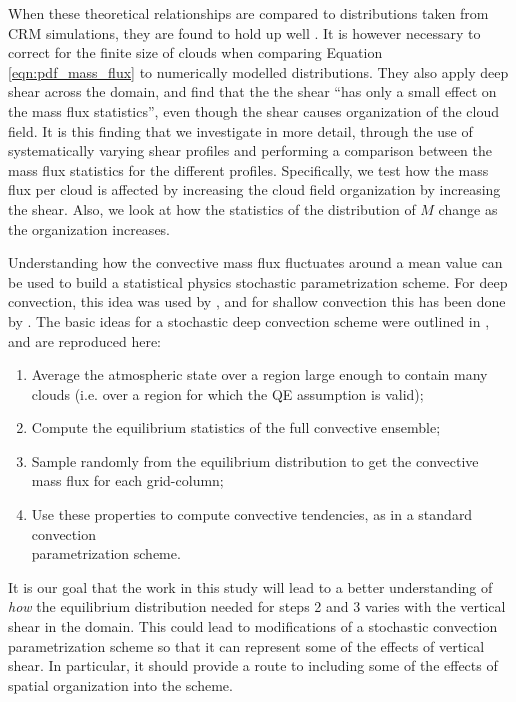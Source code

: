 \documentclass[11pt,a4paper]{article}
\newcommand\todo[1]{\textbf{TODO: #1}}
\begin{document}
When these theoretical relationships are compared to distributions taken from CRM simulations, they are found to hold up well \parencite{CC2006II}. It is however necessary to correct for the finite size of clouds when comparing Equation \ref{eqn:pdf_mass_flux} to numerically modelled distributions. They also apply deep shear across the domain, and find that the the shear ``has only a small effect on the mass flux statistics'', even though the shear causes organization of the cloud field. 
It is this finding that we investigate in more detail, through the use of systematically varying shear profiles and performing a comparison between the mass flux statistics for the different profiles. 
Specifically, we test how the mass flux per cloud is affected by increasing the cloud field organization by increasing the shear. Also, we look at how the statistics of the distribution of $M$ change as the organization increases.

Understanding how the convective mass flux fluctuates around a mean value can be used to build a statistical physics stochastic parametrization scheme. For deep convection, this idea was used by \cite{PC2008}, and for shallow convection this has been done by \cite{sakradzija2016stochastic}. The basic ideas for a stochastic deep convection scheme were outlined in \cite{PC2008}, and are reproduced here:

\begin{enumerate}
    \item Average the atmospheric state over a region large enough to contain many clouds (i.e. over a region for which the QE assumption is valid);
    \item Compute the equilibrium statistics of the full convective ensemble;
    \item Sample randomly from the equilibrium distribution to get the convective mass flux for each grid-column;
    \item Use these properties to compute convective tendencies, as in a standard convection\\parametrization scheme.
\end{enumerate}

It is our goal that the work in this study will lead to a better understanding of \textit{how} the equilibrium distribution needed for steps 2 and 3 varies with the vertical shear in the domain. This could lead to modifications of a stochastic convection parametrization scheme so that it can represent some of the effects of vertical shear. In particular, it should provide a route to including some of the effects of spatial organization into the scheme. 
\end{document}
